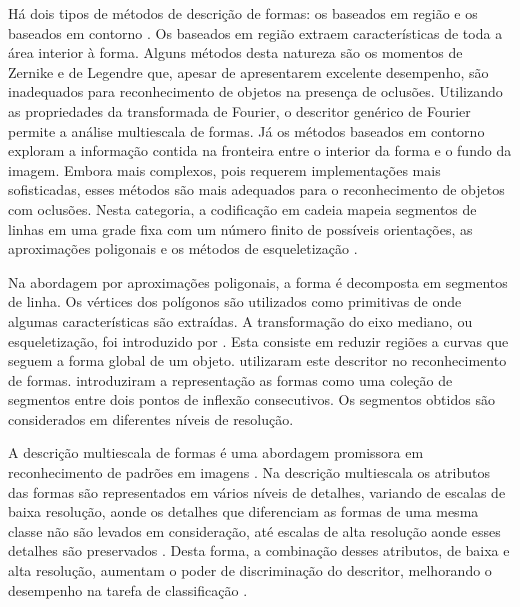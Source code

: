 Há dois tipos de métodos de descrição de formas: os baseados em região e os baseados em contorno \cite{Zhang:2004}. Os baseados em região extraem características de toda a área interior à forma. Alguns métodos desta natureza são os momentos de Zernike \cite{Kim:2000} e de Legendre \cite{Yang:2006} que, apesar de apresentarem excelente desempenho, são inadequados para reconhecimento de objetos na presença de oclusões. Utilizando as propriedades da transformada de Fourier, o descritor genérico de Fourier \cite{Zhang:2002} permite a análise multiescala de formas. Já os métodos baseados em contorno exploram a informação contida na fronteira entre o interior da forma e o fundo da imagem. Embora mais complexos, pois requerem implementações mais sofisticadas, esses métodos são mais adequados para o reconhecimento de objetos com oclusões. Nesta categoria, a codificação em cadeia \cite[p~337]{Costa:2009} mapeia segmentos de linhas em uma grade fixa com um número finito de possíveis orientações, as aproximações poligonais \cite[p~340--351]{Costa:2009} e os métodos de esqueletização \cite[p~394--400]{Costa:2009}. 

Na abordagem por aproximações poligonais, a forma é decomposta em segmentos de linha. Os vértices dos polígonos são utilizados como primitivas de onde algumas características são extraídas. A transformação do eixo mediano, ou esqueletização, foi introduzido por . Esta consiste em reduzir regiões a curvas que seguem a forma global de um objeto.  utilizaram este descritor no reconhecimento de formas.  introduziram a representação as formas como uma coleção de segmentos entre dois pontos de inflexão consecutivos. Os segmentos obtidos são considerados em diferentes níveis de resolução. 


A descrição multiescala de formas \cite{Mokhtarian:1986, Costa:1997, ShuPanWu2015, LiKuangLiuEtAl2016} é uma abordagem promissora em reconhecimento de padrões em imagens \cite{Direkoglu:2011}. Na descrição multiescala os atributos das formas são representados em vários níveis de detalhes, variando de escalas de baixa resolução, aonde os detalhes que diferenciam as formas de uma mesma classe não são levados em consideração, até escalas de alta resolução aonde esses detalhes são preservados \cite{Ullman:1996, Costa:2009}. Desta forma, a combinação desses atributos, de baixa e alta resolução, aumentam o poder de discriminação do descritor, melhorando o desempenho na tarefa de classificação \cite{Direkoglu:2011}.

